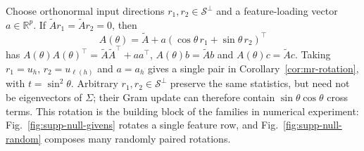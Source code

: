 {\begin{example}
{Choose orthonormal input directions $r_1,r_2\in\mathcal S^\perp$
and a feature-loading vector $a\in\mathbb R^p$.  If
$\tilde A r_1=\tilde A r_2=0$, then
\[
A(\theta)=\tilde A+a(\cos\theta\,r_1+\sin\theta\,r_2)^\top
\]
has $A(\theta)A(\theta)^\top=\tilde A\tilde A^\top+aa^\top$,
$A(\theta)b=\tilde Ab$ and $A(\theta)c=\tilde Ac$.
Taking $r_1=u_h$, $r_2=u_{\ell(h)}$ and $a=a_h$ gives a single pair in
Corollary~\ref{cor:mr-rotation}, with $t=\sin^2\theta$.
Arbitrary $r_1,r_2\in\mathcal S^\perp$ preserve the same statistics, but
need not be eigenvectors of $\Sigma$; their Gram update can therefore
contain $\sin\theta\cos\theta$ cross terms.  This rotation is the
building block of the families in numerical experiment:
Fig.~\ref{fig:supp-null-givens} rotates a single feature row, and
Fig.~\ref{fig:supp-null-random} composes many randomly paired rotations.}
\end{example}


}
